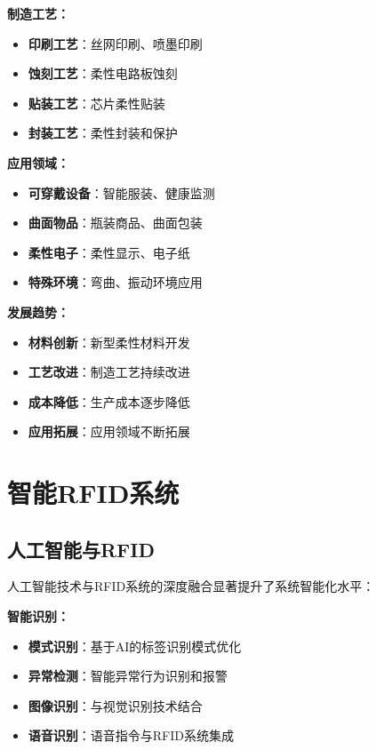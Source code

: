 \documentclass[12pt,UTF8]{ctexbook}
\begin{document}
\begin{itemize}[leftmargin=3.5em]
\begin{itemize}[leftmargin=3.5em]
\begin{itemize}[leftmargin=3.5em]
\begin{itemize}[leftmargin=3.5em]
\textbf{制造工艺：}
\begin{itemize}[leftmargin=3.5em]
    \item \textbf{印刷工艺}：丝网印刷、喷墨印刷
    \item \textbf{蚀刻工艺}：柔性电路板蚀刻
    \item \textbf{贴装工艺}：芯片柔性贴装
    \item \textbf{封装工艺}：柔性封装和保护
\end{itemize}

\textbf{应用领域：}
\begin{itemize}[leftmargin=3.5em]
    \item \textbf{可穿戴设备}：智能服装、健康监测
    \item \textbf{曲面物品}：瓶装商品、曲面包装
    \item \textbf{柔性电子}：柔性显示、电子纸
    \item \textbf{特殊环境}：弯曲、振动环境应用
\end{itemize}

\textbf{发展趋势：}
\begin{itemize}[leftmargin=3.5em]
    \item \textbf{材料创新}：新型柔性材料开发
    \item \textbf{工艺改进}：制造工艺持续改进
    \item \textbf{成本降低}：生产成本逐步降低
    \item \textbf{应用拓展}：应用领域不断拓展
\end{itemize}

\chapter{智能RFID系统}

\section{人工智能与RFID}

人工智能技术与RFID系统的深度融合显著提升了系统智能化水平：

\textbf{智能识别：}
\begin{itemize}[leftmargin=3.5em]
    \item \textbf{模式识别}：基于AI的标签识别模式优化
    \item \textbf{异常检测}：智能异常行为识别和报警
    \item \textbf{图像识别}：与视觉识别技术结合
    \item \textbf{语音识别}：语音指令与RFID系统集成
\end{itemize}


\end{itemize}
\end{itemize}
\end{itemize}
\end{itemize}
\end{document}
